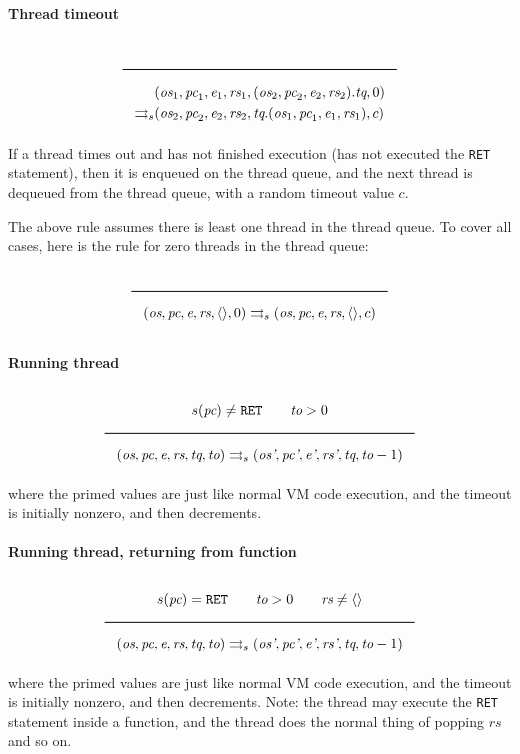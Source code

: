 \paragraph{Thread timeout}
\label{sec:org4c3611b}
$$\Rule{}{
\begin{aligned}
&(\textit{os}_1, \textit{pc}_1, \textit{e}_1, \textit{rs}_1, (\textit{os}_2, \textit{pc}_2, \textit{e}_2, \textit{rs}_2).\textit{tq}, 0)\\
\transition &(\textit{os}_2, \textit{pc}_2, \textit{e}_2, \textit{rs}_2, \textit{tq}.(\textit{os}_1, \textit{pc}_1, \textit{e}_1, \textit{rs}_1), c)
\end{aligned}}$$
If a thread times out and has not finished execution (has not executed the \texttt{RET} statement), then it is enqueued on the thread queue, and the next thread is dequeued from the thread queue, with a random timeout value \(c\).

The above rule assumes there is least one thread in the thread queue. To cover all cases, here is the rule for zero threads in the thread queue:
$$\Rule{}{(\textit{os}, \textit{pc}, \textit{e}, \textit{rs}, \langle \rangle, 0) \transition (\textit{os}, \textit{pc}, \textit{e}, \textit{rs}, \langle \rangle, c)}$$

\paragraph{Running thread}
\label{sec:orga56b1bd}
$$\Rule{s(\textit{pc}) \neq \texttt{RET} \qquad \textit{to} > 0}{(\textit{os}, \textit{pc}, \textit{e}, \textit{rs}, \textit{tq}, \textit{to}) \transition (\textit{os'}, \textit{pc'}, \textit{e'}, \textit{rs'}, \textit{tq}, \textit{to}-1)}$$
where the primed values are just like normal VM code execution, and the timeout is initially nonzero, and then decrements.

\paragraph{Running thread, returning from function}
\label{sec:org3b01708}
$$\Rule{s(\textit{pc}) = \texttt{RET} \qquad \textit{to} > 0 \qquad \textit{rs} \neq \langle \rangle}{(\textit{os}, \textit{pc}, \textit{e}, \textit{rs}, \textit{tq}, \textit{to}) \transition (\textit{os'}, \textit{pc'}, \textit{e'}, \textit{rs'}, \textit{tq}, \textit{to}-1)}$$
where the primed values are just like normal VM code execution, and the timeout is initially nonzero, and then decrements. Note: the thread may execute the \texttt{RET} statement inside a function, and the thread does the normal thing of popping \(\textit{rs}\) and so on.

